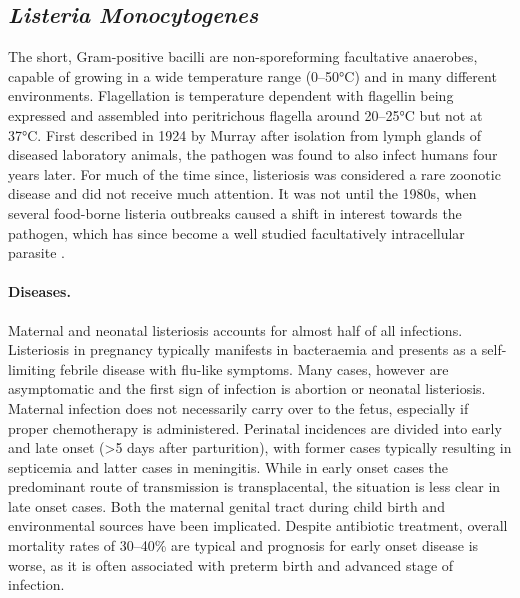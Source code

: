 \subsection{\textit{Listeria Monocytogenes}}

The short, Gram-positive bacilli are non-sporeforming facultative anaerobes, capable of growing in a wide temperature range (0--50\si{\degree}C) and in many different environments. Flagellation is temperature dependent with flagellin being expressed and assembled into peritrichous flagella around 20--25\si{\degree}C but not at 37\si{\degree}C. First described in 1924 by Murray after isolation from lymph glands of diseased laboratory animals, the pathogen was found to also infect humans four years later. For much of the time since, listeriosis was considered a rare zoonotic disease and did not receive much attention. It was not until the 1980s, when several food-borne listeria outbreaks caused a shift in interest towards the pathogen, which has since become a well studied facultatively intracellular parasite \citep{Farber1991}.

\paragraph{Diseases.}
Maternal and neonatal listeriosis accounts for almost half of all infections. Listeriosis in pregnancy typically manifests in bacteraemia and presents as a self-limiting febrile disease with flu-like symptoms. Many cases, however are asymptomatic and the first sign of infection is abortion or neonatal listeriosis. Maternal infection does not necessarily carry over to the fetus, especially if proper chemotherapy is administered. Perinatal incidences are divided into early and late onset (\textgreater 5 days after parturition), with former cases typically resulting in septicemia and latter cases in meningitis. While in early onset cases the predominant route of transmission is transplacental, the situation is less clear in late onset cases. Both the maternal genital tract during child birth and environmental sources have been implicated. Despite antibiotic treatment, overall mortality rates of 30--40\% are typical and prognosis for early onset disease is worse, as it is often associated with preterm birth and advanced stage of infection. 


